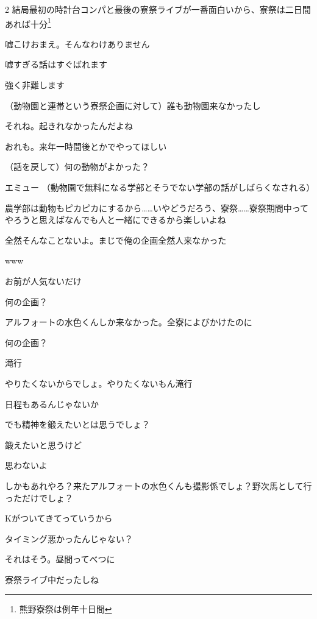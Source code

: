 \begin{multicols}{2}
 結局最初の時計台コンパと最後の寮祭ライブが一番面白いから、寮祭は二日間あれば十分\footnote{熊野寮祭は例年十日間}

 嘘こけおまえ。そんなわけありません

 嘘すぎる話はすぐばれます

 強く非難します

 （動物園と連帯という寮祭企画に対して）誰も動物園来なかったし

 それね。起きれなかったんだよね

 おれも。来年一時間後とかでやってほしい

 （話を戻して）何の動物がよかった？

 エミュー
（動物園で無料になる学部とそうでない学部の話がしばらくなされる）

 農学部は動物もピカピカにするから……いやどうだろう、寮祭……寮祭期間中ってやろうと思えばなんでも人と一緒にできるから楽しいよね

 全然そんなことないよ。まじで俺の企画全然人来なかった

 www

 お前が人気ないだけ

 何の企画？

 アルフォートの水色くんしか来なかった。全寮によびかけたのに

 何の企画？

 滝行

 やりたくないからでしょ。やりたくないもん滝行

 日程もあるんじゃないか

 でも精神を鍛えたいとは思うでしょ？

 鍛えたいと思うけど

 思わないよ

 しかもあれやろ？来たアルフォートの水色くんも撮影係でしょ？野次馬として行っただけでしょ？

 Kがついてきてっていうから

 タイミング悪かったんじゃない？

 それはそう。昼間ってべつに

 寮祭ライブ中だったしね


\end{multicols}
